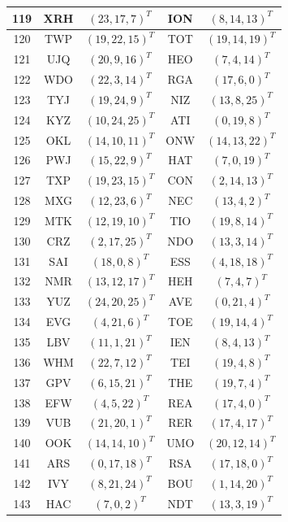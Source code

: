 \begin{longtable}{|c|c|c|c|c|}
  \hline
  119 & XRH & $(23, 17, 7)^T$ & ION & $(8, 14, 13)^T$ \\
  \hline
  120 & TWP & $(19, 22, 15)^T$ & TOT & $(19, 14, 19)^T$ \\
  \hline
  121 & UJQ & $(20, 9, 16)^T$ & HEO & $(7, 4, 14)^T$ \\
  \hline
  122 & WDO & $(22, 3, 14)^T$ & RGA & $(17, 6, 0)^T$ \\
  \hline
  123 & TYJ & $(19, 24, 9)^T$ & NIZ & $(13, 8, 25)^T$ \\
  \hline
  124 & KYZ & $(10, 24, 25)^T$ & ATI & $(0, 19, 8)^T$ \\
  \hline
  125 & OKL & $(14, 10, 11)^T$ & ONW & $(14, 13, 22)^T$ \\
  \hline
  126 & PWJ & $(15, 22, 9)^T$ & HAT & $(7, 0, 19)^T$ \\
  \hline
  127 & TXP & $(19, 23, 15)^T$ & CON & $(2, 14, 13)^T$ \\
  \hline
  128 & MXG & $(12, 23, 6)^T$ & NEC & $(13, 4, 2)^T$ \\
  \hline
  129 & MTK & $(12, 19, 10)^T$ & TIO & $(19, 8, 14)^T$ \\
  \hline
  130 & CRZ & $(2, 17, 25)^T$ & NDO & $(13, 3, 14)^T$ \\
  \hline
  131 & SAI & $(18, 0, 8)^T$ & ESS & $(4, 18, 18)^T$ \\
  \hline
  132 & NMR & $(13, 12, 17)^T$ & HEH & $(7, 4, 7)^T$ \\
  \hline
  133 & YUZ & $(24, 20, 25)^T$ & AVE & $(0, 21, 4)^T$ \\
  \hline
  134 & EVG & $(4, 21, 6)^T$ & TOE & $(19, 14, 4)^T$ \\
  \hline
  135 & LBV & $(11, 1, 21)^T$ & IEN & $(8, 4, 13)^T$ \\
  \hline
  136 & WHM & $(22, 7, 12)^T$ & TEI & $(19, 4, 8)^T$ \\
  \hline
  137 & GPV & $(6, 15, 21)^T$ & THE & $(19, 7, 4)^T$ \\
  \hline
  138 & EFW & $(4, 5, 22)^T$ & REA & $(17, 4, 0)^T$ \\
  \hline
  139 & VUB & $(21, 20, 1)^T$ & RER & $(17, 4, 17)^T$ \\
  \hline
  140 & OOK & $(14, 14, 10)^T$ & UMO & $(20, 12, 14)^T$ \\
  \hline
  141 & ARS & $(0, 17, 18)^T$ & RSA & $(17, 18, 0)^T$ \\
  \hline
  142 & IVY & $(8, 21, 24)^T$ & BOU & $(1, 14, 20)^T$ \\
  \hline
  143 & HAC & $(7, 0, 2)^T$ & NDT & $(13, 3, 19)^T$ \\

\end{longtable}
